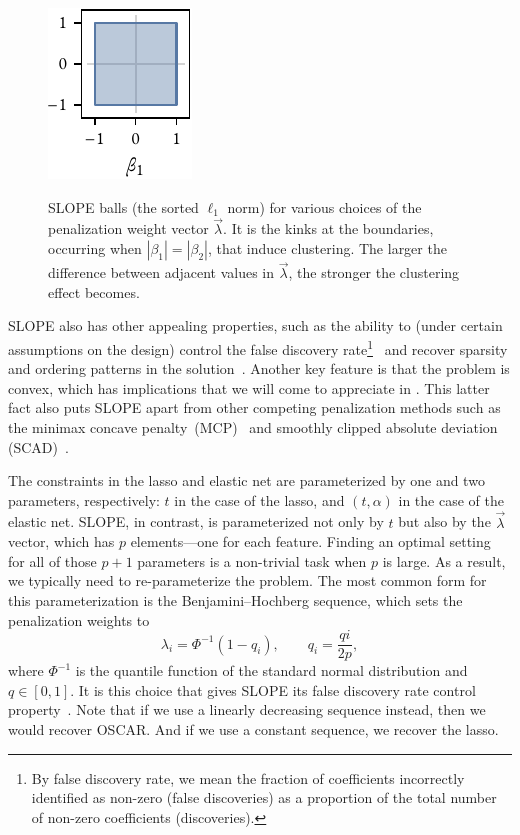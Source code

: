 \begin{figure}[htpb]
{  }{\includegraphics{figures/slope-ball-3.pdf}}
  \caption{%
    SLOPE balls (the sorted \(\ell_1\) norm) for various choices of the penalization weight vector \(\vec{\lambda}\). It is the kinks at the boundaries, occurring when \(|\beta_1| =|\beta_2|\), that induce clustering. The larger the difference between adjacent values in \(\vec{\lambda}\), the stronger the clustering effect becomes.
  }
  \label{fig:slope-balls}
\end{figure}

SLOPE also has other appealing properties, such as the ability to (under certain assumptions on the design) control the false discovery rate\footnote{By false discovery rate, we mean the fraction of coefficients incorrectly identified as non-zero (false discoveries) as a proportion of the total number of non-zero coefficients (discoveries).}~\parencite{bogdan2015} and recover sparsity and ordering patterns in the solution~\parencite{bogdan2022}. Another key feature is that the problem is convex, which has implications that we will come to appreciate in . This latter fact also puts SLOPE apart from other competing penalization methods such as the minimax concave penalty~(MCP)~\parencite{zhang2010} and smoothly clipped absolute deviation (SCAD)~\parencite{fan2001}.

The constraints in the lasso and elastic net are parameterized by one and two parameters, respectively: \(t\) in the case of the lasso, and \((t, \alpha)\) in the case of the elastic net. SLOPE, in contrast, is parameterized not only by \(t\) but also by the \(\vec{\lambda}\) vector, which has \(p\) elements---one for each feature. Finding an optimal setting for all of those \(p + 1\) parameters is a non-trivial task when \(p\) is large. As a result, we typically need to re-parameterize the problem. The most common form for this parameterization is the Benjamini--Hochberg sequence, which sets the penalization weights to
\[
  \lambda_i = \Phi^{-1}(1 - q_i), \qquad q_i = \frac{q i}{2p},
\]
where \(\Phi^{-1}\) is the quantile function of the standard normal distribution and \(q \in [0, 1]\). It is this choice that gives SLOPE its false discovery rate control property~\parencite{bogdan2015}. Note that if we use a linearly decreasing sequence instead, then we would recover OSCAR. And if we use a constant sequence, we recover the lasso.

